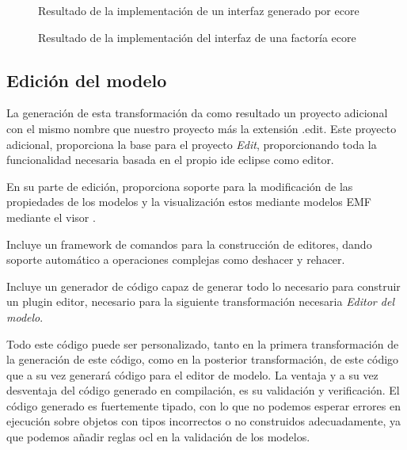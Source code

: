 \begin{figure}
	\centering
	
    \sourcepropia{}
    \caption{Resultado de la implementación de un interfaz generado por \gls{ecore}}
    \label{fig:modelo_genmodel_impl_clase}
\end{figure}

\begin{figure}
	\centering
	
    
    \sourcepropia{}
    \caption{Resultado de la implementación del interfaz de una factoría \gls{ecore}}
    \label{fig:modelo_genmodel_impl_factoria}
\end{figure}



\subsection{Edición del modelo}

La generación de esta transformación \cite{emf_edit} da como resultado un proyecto adicional con el mismo nombre que nuestro proyecto más la extensión .edit.\newline
Este proyecto adicional, proporciona la base para el proyecto \textit{Edit}, proporcionando toda la funcionalidad necesaria basada en el propio \gls{ide} eclipse como editor.

En su parte de edición, proporciona soporte para la modificación de las propiedades de los modelos y la visualización estos mediante modelos EMF mediante el visor  \textcite{jface}.

Incluye un \gls{framework} de comandos para la construcción de editores, dando soporte automático a operaciones complejas como deshacer y rehacer.

Incluye un generador de código capaz de generar todo lo necesario para construir un \gls{plugin} editor, necesario para la siguiente transformación necesaria \textit{Editor del modelo}.

Todo este código puede ser personalizado, tanto en la primera transformación de la generación de este código, como en la posterior transformación, de este código que a su vez generará código para el editor de modelo. La ventaja y a su vez desventaja del código generado en compilación, es su validación y verificación. El código generado es fuertemente tipado, con lo que no podemos esperar errores en ejecución sobre objetos con tipos incorrectos o no construidos adecuadamente, ya que podemos añadir reglas \gls{ocl} \cite{ocl} en la validación de los modelos.

